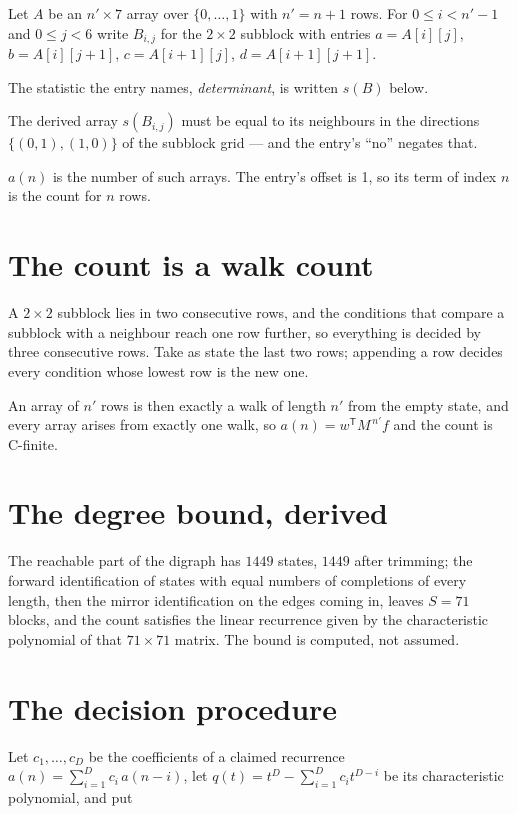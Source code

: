 \documentclass[11pt]{article}
\theoremstyle{definition}
\begin{document}
Let $A$ be an $n' \times 7$ array over $\{0,\dots,1\}$ with $n' = n + 1$ rows. For $0 \le i < n'-1$ and $0 \le j < 6$ write $B_{i,j}$ for the $2\times2$ subblock with entries $a = A[i][j]$, $b = A[i][j{+}1]$, $c = A[i{+}1][j]$, $d = A[i{+}1][j{+}1]$.

The statistic the entry names, {\itshape determinant}, is written $s(B)$ below.

The derived array $s(B_{i,j})$ must be equal to its neighbours in the directions $\{(0,1), (1,0)\}$ of the subblock grid --- and the entry's ``no'' negates that.

$a(n)$ is the number of such arrays. The entry's offset is 1, so its term of index $n$ is the count for $n$ rows.

\section{The count is a walk count}

A $2\times2$ subblock lies in two consecutive rows, and the conditions that compare a subblock with a neighbour reach one row further, so everything is decided by three consecutive rows. Take as state the last two rows; appending a row decides every condition whose lowest row is the new one.

An array of $n'$ rows is then exactly a walk of length $n'$ from the empty state, and every array arises from exactly one walk, so $a(n) = w^{\mathsf T}M^{\,n'}f$ and the count is C-finite.

\section{The degree bound, derived}

The reachable part of the digraph has $1449$ states, $1449$ after trimming; the forward identification of states with equal numbers of completions of every length, then the mirror identification on the edges coming in, leaves $S = 71$ blocks, and the count satisfies the linear recurrence given by the characteristic polynomial of that $71\times71$ matrix. The bound is computed, not assumed.

\section{The decision procedure}

Let $c_1,\dots,c_D$ be the coefficients of a claimed recurrence $a(n) = \sum_{i=1}^{D} c_i\,a(n-i)$, let $q(t) = t^{D} - \sum_{i=1}^{D} c_i t^{D-i}$ be its characteristic polynomial, and put
\end{document}
